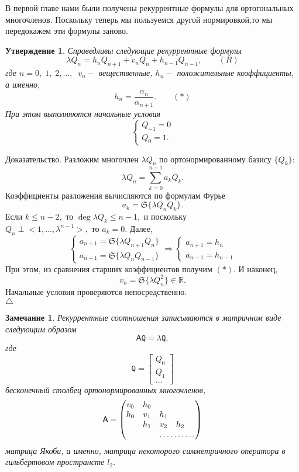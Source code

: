 \documentclass[12 pt, a4 paper]{article}
\theoremstyle{plain}   \newtheorem{Pro}{Задача}
\newtheorem{Sta}{Утверждение}
\newtheorem{Rem}{Замечание}
\begin{document}
В первой главе нами были
получены рекуррентные формулы для ортогональных многочленов.
Поскольку теперь мы пользуемся другой нормировкой,то
мы передокажем эти формулы заново.
\begin{Sta}
Справедливы следующие рекуррентные формулы
$$
  \lambda Q_n =h_n Q_{n+1}+v_n Q_n +h_{n-1}Q_{n-1},
  \qquad ( R)
$$
где
$ n=0, \; 1, \; 2,..., \; \; v_n - $
вещественные,
$ h_n - $
положительные коэффициенты, а именно,
$$
  h_n = \frac{\alpha _n }{\alpha _{n+1}} .
  \qquad ( \ast )
$$
При этом выполняются начальные условия
\begin{equation*}
  \begin{cases}
   Q_{-1}=0 \\
   Q_0 =1.
  \end{cases}
\end{equation*}
\end{Sta}
{\Large Доказательство.}
Разложим многочлен
$ \lambda Q_n $
по ортонормированному базису
$ \{ Q_k \} : $
$$
  \lambda Q_n = \sum _{k=0}^{n+1} a_k Q_k .
$$
Коэффициенты разложения вычисляются по формулам Фурье
$$
  a_k = \mathfrak{S} \{ \lambda Q_n Q_k \} .
$$
Если
$ k \leq n-2 , $
то
$ \deg \lambda Q_k \leq n-1 , $
и поскольку \\
$ Q_n \perp <1,...,\lambda ^{n-1}>, $
то
$ a_k =0 . $
Далее,
\begin{equation*}
  \begin{cases}
    a_{n+1}=\mathfrak{S} \{ \lambda Q_{n+1}Q_n \} \\
	a_{n-1}=\mathfrak{S} \{ \lambda Q_n Q_{n-1} \}
  \end{cases}
  \Rightarrow
  \begin{cases}
    a_{n+1}=h_n \\
	a_{n-1}=h_{n-1}
  \end{cases}
\end{equation*}
При этом, из сравнения старших коэффициентов получим
$ (\ast ) . $
И наконец,
$$
  v_n =\mathfrak{S} \{ \lambda Q_n ^2\} \in \mathbb{R} .
$$
Начальные условия проверяются непосредственно.\\
$ \triangle $
\begin{Rem}
Рекуррентные соотношения записываются в матричном виде следующим
образом
$$
  \mathsf{A} \mathtt{Q} = \lambda \mathtt{Q} ,
$$
где
$$
  \mathtt{Q}=
  \begin{bmatrix}
    Q_0 \\
	Q_1 \\
	\dots
  \end{bmatrix}
$$
бесконечный столбец ортонормированных многочленов,
$$
  \mathsf{A}=
    \begin{pmatrix}
	  v_0 & h_0 & \; & \; & \;  \\
	  h_0 & v_1 & h_1 & \; & \; \\
	  \; & h_1 & v_2 & h_2 & \;  \\
	  \; & \; & \hdotsfor{3}
	\end{pmatrix}
$$
матрица Якоби, а именно, матрица некоторого симметричного оператора
в гильбертовом пространсте
$ l_2 . $
\end{Rem}
\end{document}
